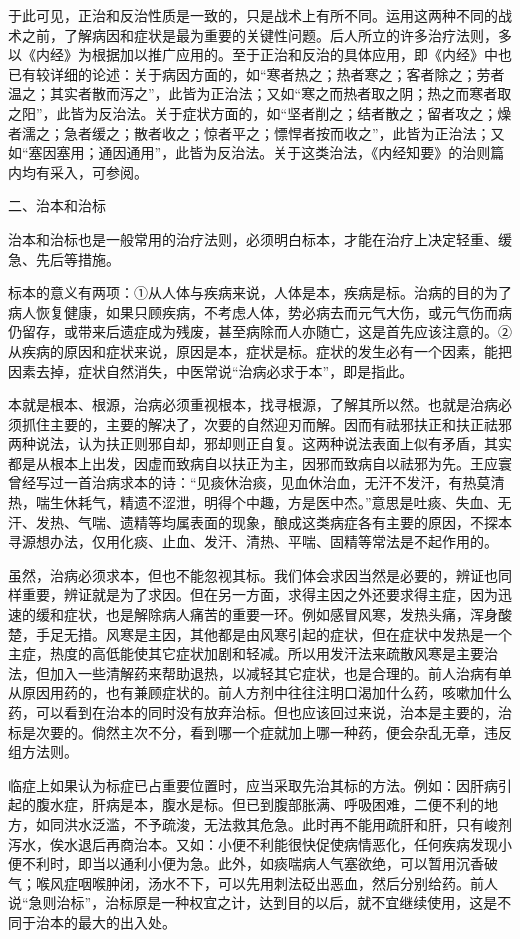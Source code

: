 \documentclass[a4paper,12pt,UTF8,twoside]{ctexbook}
\begin{document}
于此可见，正治和反治性质是一致的，只是战术上有所不同。运用这两种不同的战术之前，了解病因和症状是最为重要的关键性问题。后人所立的许多治疗法则，多以《内经》为根据加以推广应用的。至于正治和反治的具体应用，即《内经》中也已有较详细的论述：关于病因方面的，如“寒者热之；热者寒之；客者除之；劳者温之；其实者散而泻之”，此皆为正治法；又如“寒之而热者取之阴；热之而寒者取之阳”，此皆为反治法。关于症状方面的，如“坚者削之；结者散之；留者攻之；燥者濡之；急者缓之；散者收之；惊者平之；慓悍者按而收之”，此皆为正治法；又如“塞因塞用；通因通用”，此皆为反治法。关于这类治法，《内经知要》的治则篇内均有采入，可参阅。

二、治本和治标

治本和治标也是一般常用的治疗法则，必须明白标本，才能在治疗上决定轻重、缓急、先后等措施。

标本的意义有两项：①从人体与疾病来说，人体是本，疾病是标。治病的目的为了病人恢复健康，如果只顾疾病，不考虑人体，势必病去而元气大伤，或元气伤而病仍留存，或带来后遗症成为残废，甚至病除而人亦随亡，这是首先应该注意的。②从疾病的原因和症状来说，原因是本，症状是标。症状的发生必有一个因素，能把因素去掉，症状自然消失，中医常说“治病必求于本”，即是指此。

本就是根本、根源，治病必须重视根本，找寻根源，了解其所以然。也就是治病必须抓住主要的，主要的解决了，次要的自然迎刃而解。因而有祛邪扶正和扶正祛邪两种说法，认为扶正则邪自却，邪却则正自复。这两种说法表面上似有矛盾，其实都是从根本上出发，因虚而致病自以扶正为主，因邪而致病自以祛邪为先。王应寰曾经写过一首治病求本的诗：“见痰休治痰，见血休治血，无汗不发汗，有热莫清热，喘生休耗气，精遗不涩泄，明得个中趣，方是医中杰。”意思是吐痰、失血、无汗、发热、气喘、遗精等均属表面的现象，酿成这类病症各有主要的原因，不探本寻源想办法，仅用化痰、止血、发汗、清热、平喘、固精等常法是不起作用的。

虽然，治病必须求本，但也不能忽视其标。我们体会求因当然是必要的，辨证也同样重要，辨证就是为了求因。但在另一方面，求得主因之外还要求得主症，因为迅速的缓和症状，也是解除病人痛苦的重要一环。例如感冒风寒，发热头痛，浑身酸楚，手足无措。风寒是主因，其他都是由风寒引起的症状，但在症状中发热是一个主症，热度的高低能使其它症状加剧和轻减。所以用发汗法来疏散风寒是主要治法，但加入一些清解药来帮助退热，以减轻其它症状，也是合理的。前人治病有单从原因用药的，也有兼顾症状的。前人方剂中往往注明口渴加什么药，咳嗽加什么药，可以看到在治本的同时没有放弃治标。但也应该回过来说，治本是主要的，治标是次要的。倘然主次不分，看到哪一个症就加上哪一种药，便会杂乱无章，违反组方法则。

临症上如果认为标症已占重要位置时，应当采取先治其标的方法。例如：因肝病引起的腹水症，肝病是本，腹水是标。但已到腹部胀满、呼吸困难，二便不利的地方，如同洪水泛滥，不予疏浚，无法救其危急。此时再不能用疏肝和肝，只有峻剂泻水，俟水退后再商治本。又如：小便不利能很快促使病情恶化，任何疾病发现小便不利时，即当以通利小便为急。此外，如痰喘病人气塞欲绝，可以暂用沉香破气；喉风症咽喉肿闭，汤水不下，可以先用刺法砭出恶血，然后分别给药。前人说“急则治标”，治标原是一种权宜之计，达到目的以后，就不宜继续使用，这是不同于治本的最大的出入处。
\end{document}
